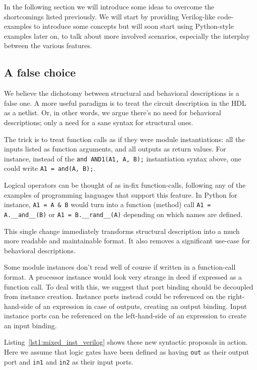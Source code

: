 \documentclass[conference,compsoc]{IEEEtran}
\begin{document}
In the following section we will introduce some ideas to overcome the shortcomings listed
previously. We will start by providing Verilog-like code-examples to introduce some concepts
but will soon start using Python-style examples later on, to talk about more involved
scenarios, especially the interplay between the various features.

\subsection{A false choice}

We believe the dichotomy between structural and behavioral descriptions is a false one.
A more useful paradigm is to treat the circuit description in the HDL as a netlist. Or, in
other words, we argue there's no need for behavioral descriptions; only a need for a sane
syntax for structural ones.

The trick is to treat function calls as if they were module instantiations: all the inputs
listed as function arguments, and all outputs as return values. For instance, instead of
the {\tt and AND1(A1, A, B);} instantiation syntax above, one could write {\tt A1 = and(A, B);}.

Logical operators can be thought of as in-fix function-calls, following any of the examples
of programming languages that support this feature. In Python for instance, {\tt A1 = A \& B}
would turn into a function (method) call {\tt A1 = A.\_\_and\_\_(B)} or {\tt A1 = B.\_\_rand\_\_(A)}
depending on which names are defined.

This single change immediately transforms structural description into a much more readable
and maintainable format. It also removes a significant use-case for behavioral descriptions.

Some module instances don't read well of course if written in a function-call format. A processor
instance would look very strange in deed if expressed as a function call. To deal with this,
we suggest that port binding should be decoupled from instance creation. Instance ports
instead could be referenced on the right-hand-side of an expression in case of outputs, creating
an output binding. Input instance ports can be referenced on the left-hand-side of an expression
to create an input binding.

Listing~\ref{lst1:mixed_inst_verilog} shows these new syntactic proposals in action. Here
we assume that logic gates have been defined as having {\tt out} as their output port and
{\tt in1} and {\tt in2} as their input ports.
\end{document}

